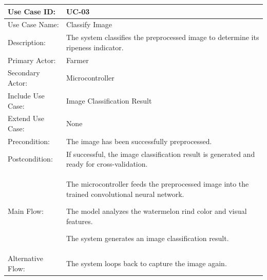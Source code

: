 \begin{thesisprose}
\FloatBarrier
\begingroup
\small
\setlength{\tabcolsep}{3pt}
\renewcommand{\arraystretch}{1.14}
\setlength{\arrayrulewidth}{0.625pt}
\def\LTcaptype{uncaptionedgrid}
\begin{longtable}{|>{\raggedright\arraybackslash}p{}|>{\raggedright\arraybackslash}p{}|}
\hline
Use Case ID: & UC-03 \\
\hline
Use Case Name: & Classify Image \\
\hline
Description: & The system classifies the preprocessed image to determine its ripeness indicator. \\
\hline
Primary Actor: & Farmer \\
\hline
Secondary Actor: & Microcontroller \\
\hline
Include Use Case: & Image Classification Result \\
\hline
Extend Use Case: & None \\
\hline
Precondition: & The image has been successfully preprocessed. \\
\hline
Postcondition: & If successful, the image classification result is generated and ready for cross-validation. \\
\hline
Main Flow: & The microcontroller feeds the preprocessed image into the trained convolutional neural network.\par The model analyzes the watermelon rind color and visual features.\par The system generates an image classification result. \\
\hline
Alternative Flow: & The system loops back to capture the image again. \\
\hline
\end{longtable}
\endgroup


\end{thesisprose}
